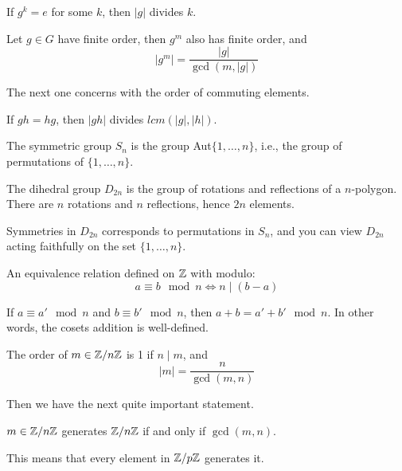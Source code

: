 \begin{prop}
    If $g^k=e$ for some $k$, then $|g|$ divides $k$.
\end{prop}
\begin{prop}
    Let $g\in G$ have finite order, then $g^m$ also has finite order, and 
    \begin{equation*}
        |g^m|=\frac{|g|}{\gcd(m,|g|)}
    \end{equation*}
\end{prop}
The next one concerns with the order of commuting elements.
\begin{prop}
    If $gh=hg$, then $|gh|$ divides $lcm(|g|, |h|)$.
\end{prop}
\begin{defn}
    The symmetric group $S_n$ is the group Aut$\{1, \dots, n\}$, i.e., the group of permutations of $\{1,\dots, n\}$.
\end{defn}
\begin{defn}
    The dihedral group $D_{2n}$ is the group of rotations and reflections of a $n$-polygon. There are $n$ rotations and $n$ reflections, hence $2n$ elements.
\end{defn}
\begin{warn}
    Symmetries in $D_{2n}$ corresponds to permutations in $S_n$, and you can view $D_{2n}$ acting faithfully on the set $\{1, \dots, n\}$.
\end{warn}
\begin{defn}[modulo]
    An equivalence relation defined on $\mathbb{Z}$ with modulo:
    \begin{equation*}
        a\equiv b \mod n \iff n\mid (b-a)
    \end{equation*}
\end{defn}
\begin{prop}
    If $a\equiv a'\mod n$ and $b\equiv b'\mod n$, then $a+b=a'+b'\mod n$. In other words, the cosets addition is well-defined.
\end{prop}
\begin{prop}
    The order of $m\in\mathbb{Z}/n\mathbb{Z}$ is 1 if $n\mid m$, and 
    \begin{equation*}
        |m|=\frac{n}{\gcd(m,n)}
    \end{equation*}
\end{prop}
Then we have the next quite important statement.
\begin{thm}
    $m\in\mathbb{Z}/n\mathbb{Z}$ generates $\mathbb{Z}/n\mathbb{Z}$ if and only if $\gcd(m,n)$.
\end{thm}
\begin{warn}
    This means that every element in $\mathbb{Z}/p\mathbb{Z}$ generates it.  
\end{warn}
